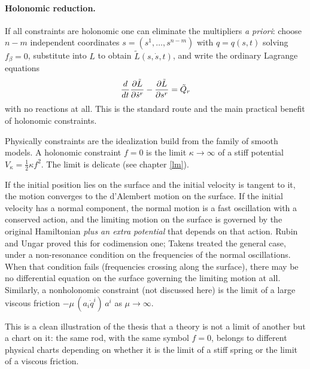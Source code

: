 \paragraph{Holonomic reduction.} If all constraints are holonomic one can eliminate
the multipliers \emph{a priori}: choose $n-m$ independent coordinates $s=(s^1,\dots,s^{n-m})$
with $q=q(s,t)$ solving $f_\beta=0$, substitute into $L$ to obtain $\tilde L(s,\dot s,t)$, and
write the ordinary Lagrange equations
\begin{equation*}
   \label {}
    \frac{d}{dt}\frac{\partial \tilde L}{\partial \dot s^r}-\frac{\partial \tilde L}{\partial s^r}=\tilde Q_r
\end{equation*}
 with no reactions at all.
This is the standard route and the main practical benefit of holonomic constraints.

Physically constraints are  the idealization build from the 
family of smooth models. A holonomic constraint $f=0$ is the limit
$\kappa\to\infty$ of a stiff potential $V_\kappa=\tfrac12\kappa f^2$. The limit
is delicate (see chapter \ref{lm}).

If the initial position lies on the surface and the initial velocity is tangent
to it, the motion converges to the d'Alembert motion on the surface. If the
initial velocity has a normal component, the normal motion is a fast
oscillation with a conserved action, and the limiting motion on the surface is
governed by the original Hamiltonian \emph{plus an extra potential} that
depends on that action. Rubin and Ungar \cite{RubinUngar1957}proved this for
codimension one; Takens \cite{Takens1980} treated the general case, under a
non-resonance condition on the frequencies of the normal oscillations. When
that condition fails (frequencies crossing along the surface), there may be no
differential equation on the surface governing the limiting motion at all.
Similarly, a nonholonomic constraint (not discussed here)  is the limit of a
large viscous friction $-\mu\,(a_i\dot q^i)\,a^i$ as $\mu\to\infty$. 

This is a clean illustration of the thesis that a theory is not a limit of
another but a chart on it: the same rod, with the same symbol $f=0$, belongs
to different physical charts depending on whether it is the limit of a stiff
spring or the limit of a viscous friction.

